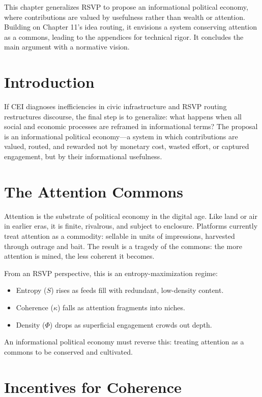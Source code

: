 \documentclass[openany]{book}
\begin{document}
This chapter generalizes RSVP to propose an informational political economy, where contributions are valued by usefulness rather than wealth or attention. Building on Chapter 11’s idea routing, it envisions a system conserving attention as a commons, leading to the appendices for technical rigor. It concludes the main argument with a normative vision.

\section{Introduction}

If CEI diagnoses inefficiencies in civic infrastructure and RSVP routing restructures discourse, the final step is to generalize: what happens when all social and economic processes are reframed in informational terms? The proposal is an informational political economy---a system in which contributions are valued, routed, and rewarded not by monetary cost, wasted effort, or captured engagement, but by their informational usefulness.

\section{The Attention Commons}

Attention is the substrate of political economy in the digital age. Like land or air in earlier eras, it is finite, rivalrous, and subject to enclosure. Platforms currently treat attention as a commodity: sellable in units of impressions, harvested through outrage and bait. The result is a tragedy of the commons: the more attention is mined, the less coherent it becomes.

From an RSVP perspective, this is an entropy-maximization regime:

\begin{itemize}
    \item Entropy ($S$) rises as feeds fill with redundant, low-density content.
    \item Coherence ($\kappa$) falls as attention fragments into niches.
    \item Density ($\Phi$) drops as superficial engagement crowds out depth.
\end{itemize}

An informational political economy must reverse this: treating attention as a commons to be conserved and cultivated.

\section{Incentives for Coherence}
\end{document}
